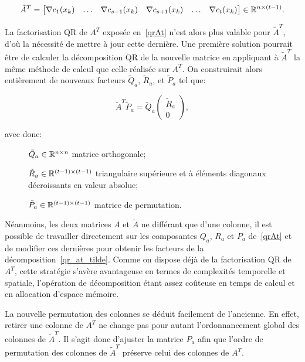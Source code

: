 \begin{equation}\label{eq:modif_AT}
    \tilde{A}^T=\begin{bmatrix}
        \nabla c_1(x_k) & \ldots & \nabla c_{s-1}(x_k) & \nabla c_{s+1}(x_k) &\ldots&  \nabla c_t(x_k)
    \end{bmatrix} \in \mathbb{R}^{n\times (t-1)}.
\end{equation}

La factorisation QR de $A^T$ exposée en~\eqref{qrAt} n'est alors plus valable pour $\tilde{A}^T$, d'où la nécessité de mettre à jour cette dernière. Une première 
solution pourrait être de calculer la décomposition QR de la nouvelle matrice en appliquant à $\tilde{A}^T$ la même méthode de calcul que celle réalisée sur $A^T$. On construirait alors 
entièrement de nouveaux facteurs $\tilde{Q}_a$, $\tilde{R}_a$, et $\tilde{P}_a$ tel que: 

\begin{equation}\label{qr_at_tilde}
    \tilde{A}^{T}\tilde{P}_{a}=\tilde{Q}_{a}
\begin{pmatrix}
\tilde{R}_{a} \\
0
\end{pmatrix},
\end{equation}

avec donc: 
\begin{description}
\item[\textbullet]
$\tilde Q_{a} \in \mathbb{R}^{n\times n}$ matrice orthogonale;
\item[\textbullet]
$\tilde R_{a} \in \mathbb{R}^{(t-1)\times (t-1)}$ triangulaire supérieure et à éléments diagonaux décroissants en valeur absolue;
\item[\textbullet]
$\tilde P_{a} \in \mathbb{R}^{(t-1)\times (t-1)}$ matrice de permutation.
\end{description}
   
 Néanmoins, les deux matrices $A$ et $\tilde{A}$ ne différant que d'une colonne, il est possible de travailler directement sur les composantes $Q_a$, $R_a$ et $P_a$ de~\eqref{qrAt} et 
 de modifier ces dernières pour obtenir les facteurs de la décomposition~\eqref{qr_at_tilde}. Comme on dispose déjà de la factorisation QR de $A^T$, cette stratégie 
 s'avère avantageuse en termes de complexités temporelle et spatiale, l'opération de décomposition étant assez co\^uteuse en temps de calcul et en allocation 
 d'espace mémoire.

 La nouvelle permutation des colonnes se déduit facilement de l'ancienne. En effet, retirer une colonne de $A^T$ ne change pas pour autant l'ordonnancement global des colonnes
 de $\tilde A^T$. Il s'agit donc d'ajuster la matrice $P_a$ afin que l'ordre de permutation des colonnes de $\tilde A^T$ préserve celui des colonnes de $A^T$.

